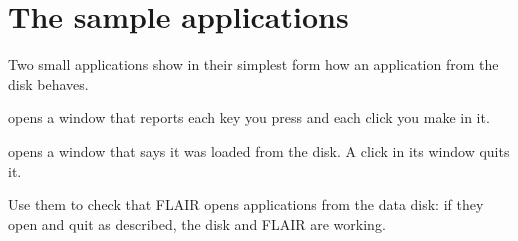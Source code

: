 
\section{The sample applications}
Two small applications show in their simplest form how an application from
the disk behaves.

 opens a window that reports each key
you press and each click you make in it.


 opens a window that says it was
loaded from the disk.  A click in its window quits it.


Use them to check that FLAIR opens applications from the data disk: if
they open and quit as described, the disk and FLAIR are working.

